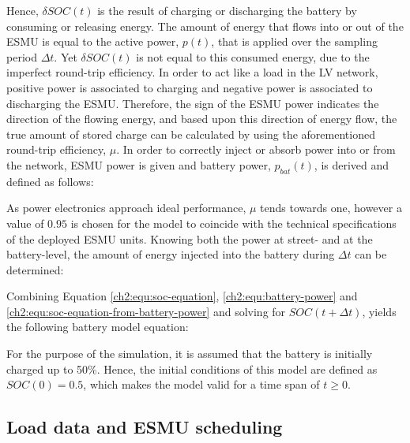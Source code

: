 

Hence, $\delta SOC(t)$ is the result of charging or discharging the battery by consuming or releasing energy.
The amount of energy that flows into or out of the ESMU is equal to the active power, $p(t)$, that is applied over the sampling period $\Delta t$.
Yet $\delta SOC(t)$ is not equal to this consumed energy, due to the imperfect round-trip efficiency.
In order to act like a load in the LV network, positive power is associated to charging and negative power is associated to discharging the ESMU.
Therefore, the sign of the ESMU power indicates the direction of the flowing energy, and based upon this direction of energy flow, the true amount of stored charge can be calculated by using the aforementioned round-trip efficiency, $\mu$.
In order to correctly inject or absorb power into or from the network, ESMU power is given and battery power, $p_{bat}(t)$, is derived and defined as follows:



As power electronics approach ideal performance, $\mu$ tends towards one, however a value of $0.95$ is chosen for the model to coincide with the technical specifications of the deployed ESMU units.
Knowing both the power at street- and at the battery-level, the amount of energy injected into the battery during $\Delta t$ can be determined:



Combining Equation \ref{ch2:equ:soc-equation}, \ref{ch2:equ:battery-power} and \ref{ch2:equ:soc-equation-from-battery-power} and solving for $SOC(t+\Delta t)$, yields the following battery model equation:



For the purpose of the simulation, it is assumed that the battery is initially charged up to 50\%.
Hence, the initial conditions of this model are defined as $SOC(0) = 0.5$, which makes the model valid for a time span of $t \geq 0$.

\subsection{Load data and ESMU scheduling}


